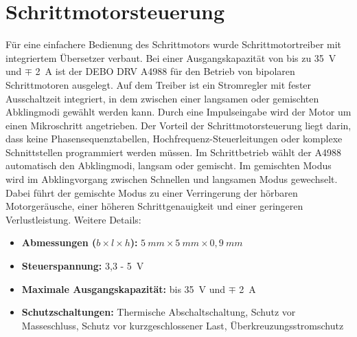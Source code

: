 \section{Schrittmotorsteuerung}	
Für eine einfachere Bedienung des Schrittmotors wurde Schrittmotortreiber mit integriertem Übersetzer verbaut. Bei einer Ausgangskapazität von bis zu 35\ V und $\mp$ 2\ A ist der DEBO DRV A4988 für den Betrieb von bipolaren Schrittmotoren ausgelegt. Auf dem Treiber ist ein Stromregler mit fester Ausschaltzeit integriert, in dem zwischen einer langsamen oder gemischten Abklingmodi gewählt werden kann. Durch eine Impulseingabe wird der Motor um einen Mikroschritt angetrieben. Der Vorteil der Schrittmotorsteuerung liegt darin, dass keine Phasensequenztabellen, Hochfrequenz-Steuerleitungen oder komplexe Schnittstellen programmiert werden müssen. Im Schrittbetrieb wählt der A4988 automatisch den Abklingmodi, langsam oder gemischt. Im gemischten Modus wird im Abklingvorgang zwischen Schnellen und langsamen Modus gewechselt. Dabei führt der gemischte Modus zu einer Verringerung der hörbaren Motorgeräusche, einer höheren Schrittgenauigkeit und einer geringeren Verlustleistung.  
Weitere Details: \begin{itemize}
	\item \textbf{Abmessungen ($b \times l \times h$):} $5 \ mm \times 5 \ mm \times 0,9 \ mm$
	\item \textbf{Steuerspannung:} 3,3 - 5\ V
	\item \textbf{Maximale Ausgangskapazität:} bis 35\ V und $\mp$ 2\ A
	\item \textbf{Schutzschaltungen:}  Thermische Abschaltschaltung, Schutz vor Masseschluss, Schutz vor kurzgeschlossener Last, Überkreuzungsstromschutz
\cite{Allegro.2022}
\end{itemize}




